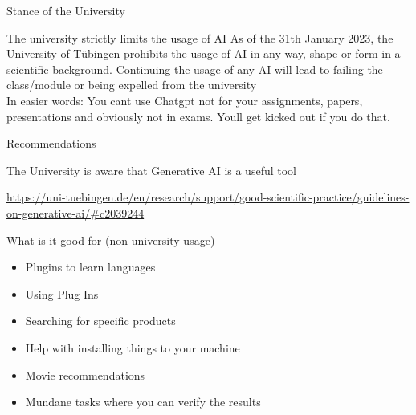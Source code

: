 \documentclass[aspectratio=169,hyperref={unicode}]{beamer}
\begin{document}
\begin{frame}{Stance of the University}
	
\begin{alertblock}{The university strictly limits the usage of AI}
	As of the 31th January 2023, the University of Tübingen prohibits the usage of AI in any way, shape or form in a scientific background. Continuing the usage of any AI will lead to failing the class/module or being expelled from the university \\
 In easier words: You cant use Chatgpt not for your assignments, papers, presentations and obviously not in exams. Youll get kicked out if you do that.\\
\end{alertblock}
\end{frame}

\begin{frame}{Recommendations}
	
\begin{alertblock}{The University is aware that Generative AI is a useful tool}

 \url{https://uni-tuebingen.de/en/research/support/good-scientific-practice/guidelines-on-generative-ai/\#c2039244}

\end{alertblock}
\end{frame}


\begin{frame}{What is it good for (non-university usage)}


\begin{itemize}
\item Plugins to learn languages\\
\item Using Plug Ins \\
\item Searching for specific products\\
\item Help with installing things to your machine\\
\item Movie recommendations
\item Mundane tasks where you can verify the results
\end{itemize}

\end{frame}
\end{document}
